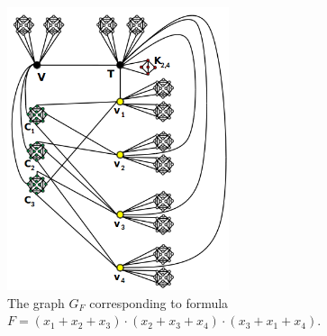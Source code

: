 \begin{figure}[htb]	
\center%
\includegraphics[width=6.5cm]{./img/exemploGrafoGFSBPO4.png}
\caption{The  graph $G_{F}$ corresponding to formula $F=(x_1+ x_2+ x_3) \cdot  (x_2+ x_3+ x_4 )\cdot  (x_3 + x_1 + x_4 )$.}
\label{fig:exemploGrafoGF}
\end{figure}